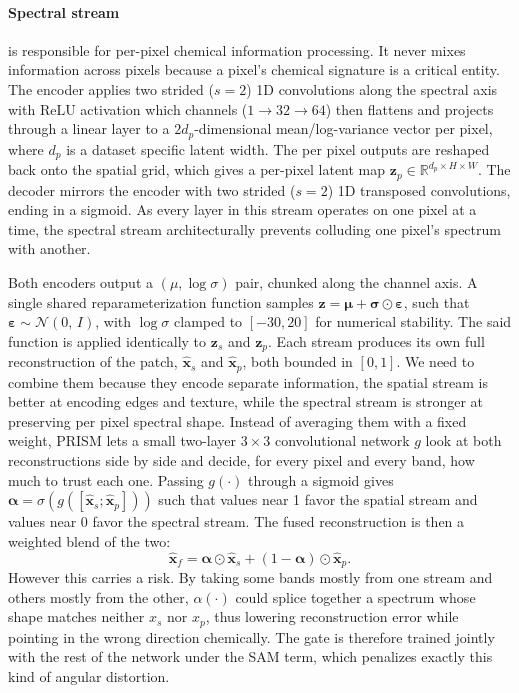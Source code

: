 \documentclass[twoside,11pt]{article}
\newcommand{\xh}{\hat{\mathbf{x}}}
\newcommand{\z}{\mathbf{z}}
\newcommand{\R}{\mathbb{R}}
\begin{document}
\paragraph{Spectral stream}
is responsible for per-pixel chemical information processing. It never mixes information across pixels because a pixel's chemical signature is a critical entity. The encoder applies two strided ($s=2$) 1D convolutions along the spectral axis with $\mathrm{ReLU}$ activation which channels ($1\rightarrow32\rightarrow64$) then flattens and projects through a linear layer to a $2d_p$-dimensional mean/log-variance vector per pixel, where $d_p$ is a dataset specific latent width. The per pixel outputs are reshaped back onto the spatial grid, which gives a per-pixel latent map $\z_p \in \R^{d_p\times H\times W}$. The decoder mirrors the encoder with two strided ($s=2$) 1D transposed convolutions, ending in a sigmoid. As every layer in this stream operates on one pixel at a time, the spectral stream architecturally prevents colluding one pixel's spectrum with another.

Both encoders output a $(\mu, \log\sigma)$ pair, chunked along the channel axis. A single shared reparameterization function samples $\z = \boldsymbol{\mu} + \boldsymbol{\sigma}\odot\boldsymbol{\varepsilon}$, such that $\boldsymbol{\varepsilon}\sim\mathcal{N}(0,\,I)$, with $\log\sigma$ clamped to $[-30, 20]$ for numerical stability. The said function is applied identically to $\z_s$ and $\z_p$. Each stream produces its own full reconstruction of the patch, $\xh_s$ and $\xh_p$, both bounded in $[0,1]$. We need to combine them because they encode separate information, the spatial stream is better at encoding edges and texture, while the spectral stream is stronger at preserving per pixel spectral shape. Instead of averaging them with a fixed weight, PRISM lets a small two-layer $3{\times}3$ convolutional network $g$ look at both reconstructions side by side and decide, for every pixel and every band, how much to trust each one. Passing $g(\cdot)$ through a sigmoid gives $\boldsymbol{\alpha} = \sigma(g([\xh_s;\xh_p]))$ such that values near 1 favor the spatial stream and values near 0 favor the spectral stream. The fused reconstruction is then a weighted blend of the two:
\begin{equation}
  \xh_f = \boldsymbol{\alpha}\odot\xh_s + (1-\boldsymbol{\alpha})\odot\xh_p.
  \label{eq:fusion}
\end{equation}
However this carries a risk. By taking some bands mostly from one stream and others mostly from the other, $\alpha(\cdot)$ could splice together a spectrum whose shape matches neither $x_s$ nor $x_p$, thus lowering reconstruction error while pointing in the wrong direction chemically. The gate is therefore trained jointly with the rest of the network under the SAM term, which penalizes exactly this kind of angular distortion.
\end{document}
